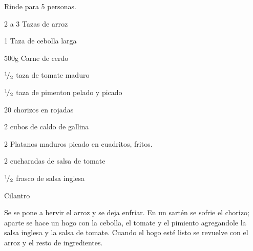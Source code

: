 
Rinde para 5 personas.\\

\begin{ingredientes}
\item 2 a 3 Tazas de arroz
\item 1 Taza de cebolla larga
\item 500g Carne de cerdo
\item ${}^{1}\!/_{2}$ taza de tomate maduro
\item ${}^{1}\!/_{2}$ taza de pimenton pelado y picado
\item 20 chorizos en rojadas
\item 2 cubos de caldo de gallina
\item 2 Platanos maduros picado en cuadritos, fritos.
\item 2 cucharadas de salsa de tomate
\item ${}^{1}\!/_{2}$ frasco de salsa inglesa
\item Cilantro
\end{ingredientes}
\preparacion
Se se pone a hervir el arroz y se deja enfriar. En un sartén se sofrie el chorizo; aparte se hace un hogo con la cebolla, el tomate y el pimiento agregandole la salsa inglesa y la salsa de tomate. Cuando el hogo esté listo se revuelve con el arroz y el resto de ingredientes.